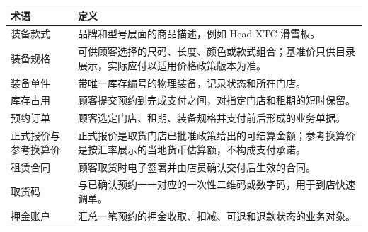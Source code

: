 {\def\LTcaptype{none} %
\begin{longtable}[]{@{}
  >{\centering\arraybackslash}p{}
  >{\raggedright\arraybackslash}p{}@{}}
\toprule\noalign{}\rowcolor{TableHead}
\begin{minipage}[b]{\linewidth}\color{white}\bfseries\centering
\textbf{术语}
\end{minipage} & \begin{minipage}[b]{\linewidth}\color{white}\bfseries\centering
\textbf{定义}
\end{minipage} \\
\midrule\noalign{}
\endhead
\bottomrule\noalign{}
\endlastfoot
装备款式 & 品牌和型号层面的商品描述，例如 Head XTC 滑雪板。 \\
装备规格 & 可供顾客选择的尺码、长度、颜色或款式组合；基准价只供目录展示，实际应付以适用价格政策版本为准。 \\
装备单件 & 带唯一库存编号的物理装备，记录状态和所在门店。 \\
库存占用 & 顾客提交预约到完成支付之间，对指定门店和租期的短时保留。 \\
预约订单 & 顾客选定门店、租期、装备规格并支付前后形成的业务单据。 \\
正式报价与参考换算价 & 正式报价是取货门店已批准政策给出的可结算金额；参考换算价是按汇率展示的当地货币估算额，不构成支付承诺。 \\
租赁合同 & 顾客取货时电子签署并由店员确认交付后生效的合同。 \\
取货码 & 与已确认预约一一对应的一次性二维码或数字码，用于到店快速调单。 \\
押金账户 & 汇总一笔预约的押金收取、扣减、可退和退款状态的业务对象。 \\
\end{longtable}
}

\FloatBarrier
{}\label{chap:business}


\label{chap:requirements}


\label{chap:analysis}


\label{chap:design}

\label{chap:erd}


